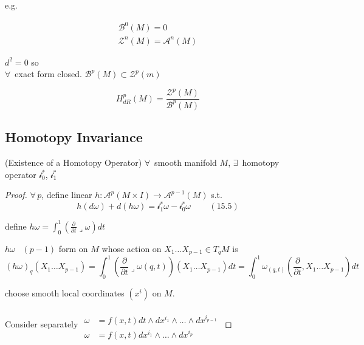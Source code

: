 e.g.

\[
\begin{aligned}
  \mathcal{B}^0(M)=0 \\ 
  \mathcal{Z}^n(M) = \mathcal{A}^n(M)
\end{aligned}
\]

$d^2=0$ so \\
$\forall \, $ exact form closed.  $\mathcal{B}^p(M) \subset \mathcal{Z}^p(m)$

\[
H^p_{dR}(M) = \frac{\mathcal{Z}^p(M)}{ \mathcal{B}^p(M) }
\]


\subsection*{Homotopy Invariance}

\begin{lemma}[15.4] (Existence of a Homotopy Operator)
  $\forall \, $ smooth manifold $M$, $\exists \, $ homotopy operator $\mathcal{i}_0^*$, $\mathcal{i}^*_1$
\end{lemma}

\begin{proof} $\forall \, p$, define linear $h: \mathcal{A}^p(M\times I) \to \mathcal{A}^{p -1}(M)$ s.t. 
\begin{equation}
h(d\omega ) + d(h \omega) = \mathcal{i}^*_1 \omega - \mathcal{i}_0^*\omega  \quad \quad \, (15.5)
\end{equation}


define $h\omega = \int_0^1 \left( \frac{ \partial }{\partial t} \lrcorner \omega \right) dt$


$h \omega$ \, $(p-1)$ form on $M$ whose action on $X_1 \dots X_{p-1} \in T_qM$ is 
\[
(h\omega)_q(X_1  \dots X_{p-1}) = \int_0^1 \left( \frac{ \partial }{ \partial t} \lrcorner \omega(q,t) \right)(X_1 \dots X_{p-1} ) dt = \int_0^1 \omega_{(q,t)}\left( \frac{ \partial}{\partial t}, X_1 \dots X_{p-1} \right) dt 
\]

choose smooth local coordinates $(x^i)$ on $M$.

Consider separately $\begin{aligned} & \quad \\ 
  \omega  & = f(x,t) dt \wedge dx^{i_1} \wedge \dots \wedge dx^{i_{p-1} } \\  
  \omega & = f(x,t) dx^{i_1} \wedge \dots \wedge dx^{i_p } \end{aligned}$


\end{proof}
